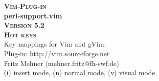 \documentclass[oneside,10pt,landscape,DIV17]{scrartcl}
\newcommand{\Pluginversion}{5.2}
\begin{document}
%

\begin{multicols}{3}
%
\begin{center}
%
\textbf{\textsc{\small{Vim-Plug-in}}}\\
\textbf{\LARGE{perl-support.vim}}\\
\textbf{\textsc{\small{Version \Pluginversion}}}\\
\vspace{5mm}%
\textbf{\textsc{\Huge{Hot keys}}}\\ 
\vspace{5mm}%
Key mappings for Vim and gVim.\\
Plug-in: http://vim.sourceforge.net\\
Fritz Mehner (mehner.fritz@fh-swf.de)\\
\vspace{1.0mm}
{\normalsize (i)} insert mode, {\normalsize (n)} normal mode, {\normalsize (v)} visual mode\\
\vspace{4.0mm}


\end{center}
\end{multicols}
\end{document}
